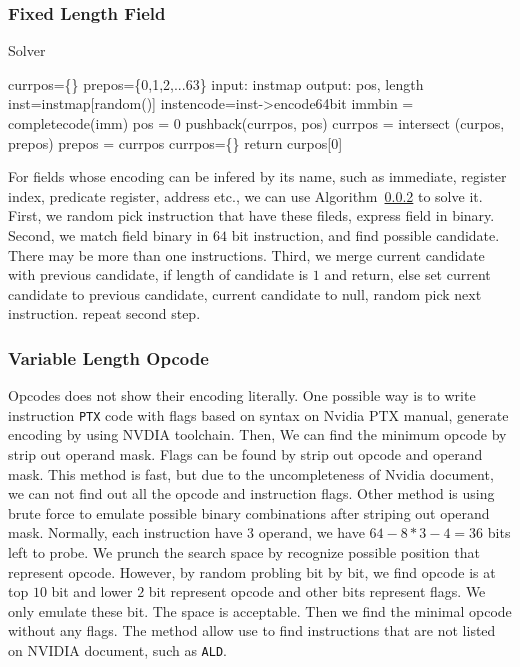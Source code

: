 \documentclass{sig-alternate-05-2015}
\begin{document}
\subsubsection{Fixed Length Field}

\begin{algorithm}
      \caption{Solver}\label{integer_solver}
  \begin{algorithmic}[1]
      \State currpos=\{\}
      \State prepos=\{0,1,2,...63\}
      \State input: instmap
      \State output: pos, length
      \State inst=instmap[random()]
      \State instencode=inst->encode64bit
      \State immbin = completecode(imm)
      \State pos = 0
      \State pushback(currpos, pos)
      \EndIf
      \EndWhile
      \State currpos = intersect (curpos, prepos)
      \State prepos = currpos
      \State currpos=\{\}
      \EndIf
      \EndWhile
      \State return curpos[0]
  \end{algorithmic}
\end{algorithm}

For fields whose encoding can be infered by its name, such as immediate, register index, predicate register, address etc., we can use Algorithm~\ref{} to solve it.
First, we random pick instruction that have these fileds, express field in binary. Second, we match field binary in $64$
bit instruction, and find possible candidate. There may be more than one instructions. Third, we merge current candidate
with previous candidate, if length of candidate is $1$ and return, else set current candidate to previous candidate, current candidate to null, random pick next instruction. repeat second step.
\subsubsection{Variable Length Opcode}
Opcodes does not show their encoding literally. One possible way is to write instruction {\tt PTX} code with flags based on syntax on Nvidia
PTX manual, generate encoding by using NVDIA toolchain.
Then, We can find the minimum opcode by strip out operand mask. Flags can be found by strip out opcode and operand mask.
This method is fast, but due to the uncompleteness of Nvidia document, we can not find out all the opcode and
instruction flags.
Other method is using brute force to emulate possible binary combinations after striping out operand mask.
Normally, each instruction have $3$ operand, we have $64-8*3-4=36$ bits left to probe. We prunch the search space by
recognize possible position that represent opcode.  However, by random probling bit
by bit, we find opcode is at top $10$ bit and lower $2$ bit represent opcode and other bits represent flags. We only emulate these bit.
The space is acceptable. Then we find the minimal opcode without any flags. The method allow use to find instructions
that are not listed on NVIDIA document, such as {\tt ALD}.
\end{document}
